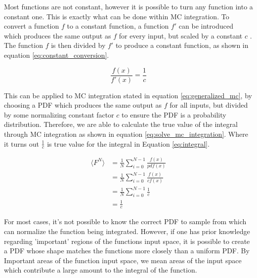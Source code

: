 \documentclass[../dissertation.tex]{subfiles}
\begin{document}
Most functions are not constant, however it is possible to turn any function into a constant one. This is exactly what can be done within MC integration. To convert a function $f$ to a constant function, a function $f'$ can be introduced which produces the same output as $f$ for every input, but scaled by a constant $c$ \cite{scratchapixel_2015}. The function $f$ is then divided by $f'$ to produce a constant function, as shown in equation \ref{eq:constant_conversion}.

\begin{equation}
\label{eq:constant_conversion}
\frac{f(x)}{f'(x)} = \frac{1}{c}
\end{equation}

This can be applied to MC integration stated in equation \ref{eq:generalized_mc}, by choosing a PDF  which produces the same output as $f$ for all inputs, but divided by some normalizing constant factor $c$ to ensure the PDF is a probability distribution. Therefore, we are able to calculate the true value of the integral through MC integration as shown in equation \ref{eq:solve_mc_integration}. Where it turns out $\frac{1}{c}$ is true value for the integral in Equation \ref{eq:integral}.

\begin{align}
\label{eq:solve_mc_integration}
\langle F^N \rangle & = \frac{1}{N} \sum^{N-1}_{i=0} \frac{f(x)}{pdf(x)} \\
& = \frac{1}{N} \sum^{N-1}_{i=0} \frac{f(x)}{cf(x)} \nonumber \\
& =  \frac{1}{N} \sum^{N-1}_{i=0} \frac{1}{c} \nonumber \\
& = \frac{1}{c} \nonumber
\end{align}

For most cases, it's not possible to know the correct PDF to sample from which can normalize the function being integrated. However, if one has prior knowledge regarding 'important' regions of the functions input space, it is possible to create a PDF whose shape matches the functions more closely than a uniform PDF. By Important areas of the function input space, we mean areas of the input space which contribute a large amount to the integral of the function.
\end{document}
